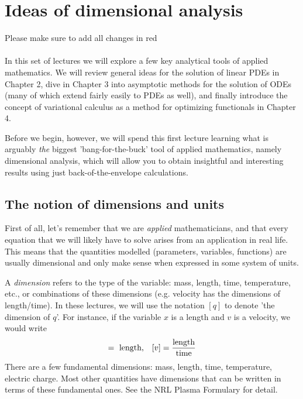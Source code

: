 \chapter{Ideas of dimensional analysis}

{\color{red} Please make sure to add all changes in red}
\\
\\
In this set of lectures we will explore a few key analytical tools of applied mathematics. We will review general ideas for the solution of linear PDEs in Chapter 2, dive in Chapter 3 into asymptotic methods for the solution of ODEs (many of which extend fairly easily to PDEs as well), and finally introduce the concept of variational calculus as a method for optimizing functionals in Chapter 4. 

Before we begin, however, we will spend this first lecture learning what is arguably {\it the} biggest 'bang-for-the-buck' tool of applied mathematics, namely dimensional analysis, which will allow you to obtain insightful and interesting results using just back-of-the-envelope calculations. 

\section{The notion of dimensions and units}

First of all, let's remember that we are {\it applied} mathematicians, and that every equation that we will likely have to solve arises from an application in real life. This means that the quantities modelled (parameters, variables, functions) are usually  dimensional and  only make sense when expressed in some system of units. 

A {\it dimension} refers to the type of the variable: mass, length, time, temperature, etc., or combinations of these dimensions (e.g. velocity has the dimensions of length/time). In these lectures, we will use the notation $[q]$ to denote 'the dimension of $q$'. For instance, if the variable $x$ is a length and $v$ is a velocity, we would write \begin{equation} 
[x]= \mbox{ length,} \quad [v] = \frac{\rm length}{\rm time}
\end{equation}
There are a few fundamental dimensions: mass, length, time, temperature, electric charge. Most other quantities have dimensions that can be written in terms of these fundamental ones. See the NRL Plasma Formulary for detail. 
 
